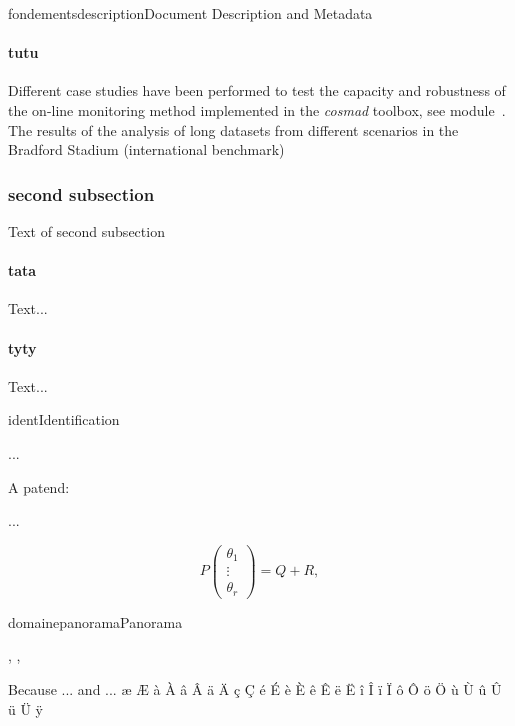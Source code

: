 \documentclass{ra2011}
\begin{document}
\begin{module}{fondements}{description}{Document Description and Metadata}
\paragraph{tutu}
Different case studies have been performed to test the capacity and robustness 
of the on-line monitoring method implemented in the \emph{cosmad} toolbox, 
see module~\protect{}.
The results of the analysis 
of long datasets from different scenarios in the Bradford Stadium (international benchmark)

\subsubsection{second subsection}
Text of second subsection
\paragraph{tata}
Text...

\paragraph{tyty}
Text...
\end{module}


\begin{module}{}{ident}{Identification}

...

A patend: \cite{Algo09} 

...

\begin{equation}
  P \left(\begin{array} {c}
     \theta_{1} \\ \vdots  \\ \theta_{r} 
\end{array}
  \right) = Q + R, \label{noisident}
\end{equation}

\end{module}


\begin{module}{domaine}{panorama}{Panorama}
\begin{participants}
  ,
  ,
\end{participants}


Because ... and ... æ Æ à À â Â ä Ä ç Ç é É è È ê Ê ë Ë î Î ï Ï ô Ô ö Ö ù Ù û Û ü Ü ÿ

\end{module}
\end{document}
